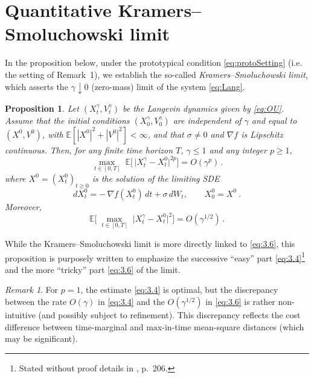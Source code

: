 \documentclass[12pt]{article}
\numberwithin{equation}{section}
\newtheorem{proposition}{Proposition}
\theoremstyle{remark}
\newtheorem{remark}{Remark}
\begin{document}
\section{Quantitative Kramers--Smoluchowski limit}

In the proposition below, under the prototypical condition \eqref{eq:protoSetting} (i.e. the setting of Remark 1), we establish the so-called \emph{Kramers--Smoluchowski limit}, which asserts the $\gamma \downarrow 0$ (zero-mass) limit of the system \eqref{eq:Lang}.

\begin{proposition}
Let $(X_t^\gamma, V_t^\gamma)$ be the Langevin dynamics given by \eqref{eq:OU}. Assume that the initial conditions $(X_0^\gamma, V_0^\gamma)$ are independent of $\gamma$ and equal to $(X^0, V^0)$, with $\mathbb{E}[|X^0|^2 + |V^0|^2] < \infty$, and that $\sigma \neq 0$ and $\nabla f$ is Lipschitz continuous. Then, for any finite time horizon $T$, $\gamma \le 1$ and any integer $p \ge 1$, 
\begin{equation}\label{eq:3.4}
\max_{\,t \in [0,T]}\;\mathbb{E}\!\Big[\,\big|X_t^\gamma - X_t^0\big|^{2p}\Big] = O(\gamma^p)\,.
\end{equation}
where $X^0 = (X_t^0)_{t\ge0}$ is the solution of the limiting SDE 
\begin{equation}\label{eq:3.5}
dX_t^0 = -\,\nabla f(X_t^0)\,dt + \sigma\,dW_t, \qquad X_0^0 = X^0~. 
\end{equation}
Moreover, 
\begin{equation}\label{eq:3.6}
\mathbb{E}\!\Big[\,\max_{\,t \in [0,T]}\;\big|X_t^\gamma - X_t^0\big|^2\Big] = O(\gamma^{1/2})\,. 
\end{equation}
\end{proposition}

While the Kramers--Smoluchowski limit is more directly linked to \eqref{eq:3.6}, this proposition is purposely written to emphasize the successive “easy” part \eqref{eq:3.4}\footnote{Stated without proof details in \cite{p14}, p. 206.} and the more “tricky” part \eqref{eq:3.6} of the limit. 

\begin{remark}
For $p = 1$, the estimate \eqref{eq:3.4} is optimal, but the discrepancy between the rate $O(\gamma)$ in \eqref{eq:3.4} and the $O(\gamma^{1/2})$ in \eqref{eq:3.6} is rather non-intuitive (and possibly subject to refinement). This discrepancy reflects the cost difference between time-marginal and max-in-time mean-square distances (which may be significant).
\end{remark}
\end{document}
